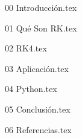 \documentclass[12pt, a4paper]{article}
\begin{document}
\sffamily


\tableofcontents
\newpage

{00 Introducción.tex}
\newpage

{01 Qué Son RK.tex}
\newpage

{02 RK4.tex}
\newpage

{03 Aplicación.tex}
\newpage

{04 Python.tex}
\newpage

{05 Conclusión.tex}
\newpage

{06 Referencias.tex}
\end{document}
